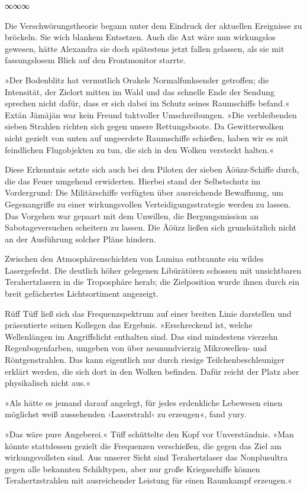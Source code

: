 \begin{center}
∞∞∞
\end{center}

Die Verschwörungstheorie begann unter dem Eindruck der aktuellen Ereignisse zu bröckeln. Sie wich blankem Entsetzen. Auch die Axt wäre nun wirkungslos gewesen, hätte Alexandra sie doch spätestens jetzt fallen gelassen, als sie mit fassungslosem Blick auf den Frontmonitor starrte.

»Der Bodenblitz hat vermutlich Orakels Normalfunksender getroffen; die Intensität, der Zielort mitten im Wald und das schnelle Ende der Sendung sprechen nicht dafür, dass er sich dabei im Schutz seines Raumschiffs befand.« Extän Jämäjän war kein Freund taktvoller Umschreibungen. »Die verbleibenden sieben Strahlen richten sich gegen unsere Rettungsboote. Da Gewitterwolken nicht gezielt von unten auf ungeerdete Raumschiffe schießen, haben wir es mit feindlichen Flugobjekten zu tun, die sich in den Wolken versteckt halten.«

Diese Erkenntnis setzte sich auch bei den Piloten der sieben Äöüzz-Schiffe durch, die das Feuer umgehend erwiderten. Hierbei stand der Selbstschutz im Vordergrund: Die Militärschiffe verfügten über ausreichende Bewaffnung, um Gegenangriffe zu einer wirkungsvollen Verteidigungsstrategie werden zu lassen. Das Vorgehen war gepaart mit dem Unwillen, die Bergungsmission an Sabotageversuchen scheitern zu lassen. Die Äöüzz ließen sich grundsätzlich nicht an der Ausführung solcher Pläne hindern.

Zwischen den Atmosphärenschichten von Lumina entbrannte ein wildes Lasergefecht. Die deutlich höher gelegenen Libürätören schossen mit unsichtbaren Terahertzlasern in die Troposphäre herab; die Zielposition wurde ihnen durch ein breit gefächertes Lichtsortiment angezeigt.

Rüff Tüff ließ sich das Frequenzspektrum auf einer breiten Linie darstellen und präsentierte seinen Kollegen das Ergebnis. »Erschreckend ist, welche Wellenlängen im Angriffslicht enthalten sind. Das sind mindestens vierzehn Regenbogenfarben, umgeben von über neunundvierzig Mikrowellen- und Röntgenstrahlen. Das kann eigentlich nur durch riesige Teilchenbeschleuniger erklärt werden, die sich dort in den Wolken befinden. Dafür reicht der Platz aber physikalisch nicht aus.«

»Als hätte es jemand darauf angelegt, für jedes erdenkliche Lebewesen einen möglichst weiß aussehenden ›Laserstrahl‹ zu erzeugen«, fand yury.

»Das wäre pure Angeberei.« Tüff schüttelte den Kopf vor Unverständnis. »Man könnte stattdessen gezielt die Frequenzen verschießen, die gegen das Ziel am wirkungsvollsten sind. Aus unserer Sicht sind Terahertzlaser das Nonplusultra gegen alle bekannten Schildtypen, aber nur große Kriegsschiffe können Terahertzstrahlen mit ausreichender Leistung für einen Raumkampf erzeugen.«

